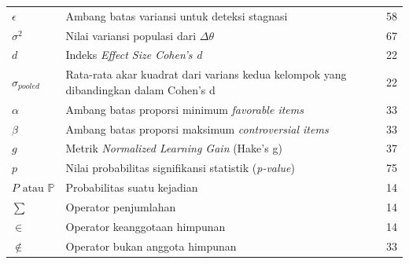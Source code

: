 \begin{longtable}{@{} l >{\raggedright\arraybackslash}p{6.5cm} c @{}}
$\epsilon$ & Ambang batas variansi untuk deteksi stagnasi & 58 \\
$\sigma^2$ & Nilai variansi populasi dari $\Delta\theta$ & 67    \\
$d$ & Indeks \textit{Effect Size Cohen's d} & 22 \\
$\sigma_{pooled}$ &  Rata-rata akar kuadrat dari varians kedua kelompok yang dibandingkan dalam Cohen's d & 22 \\
$\alpha$ & Ambang batas proporsi minimum \textit{favorable items} & 33 \\
$\beta$ & Ambang batas proporsi maksimum \textit{controversial items} & 33 \\
$g$ & Metrik \textit{Normalized Learning Gain} (Hake's g) & 37 \\
$p$ & Nilai probabilitas signifikansi statistik (\textit{p-value}) & 75 \\

$P  \text{ atau } \mathbb{P}$ & Probabilitas suatu kejadian & 14 \\
$\sum$ & Operator penjumlahan & 14 \\
$\in$ & Operator keanggotaan himpunan & 14 \\
$\notin$ & Operator bukan anggota himpunan & 33 \\

\end{longtable}
